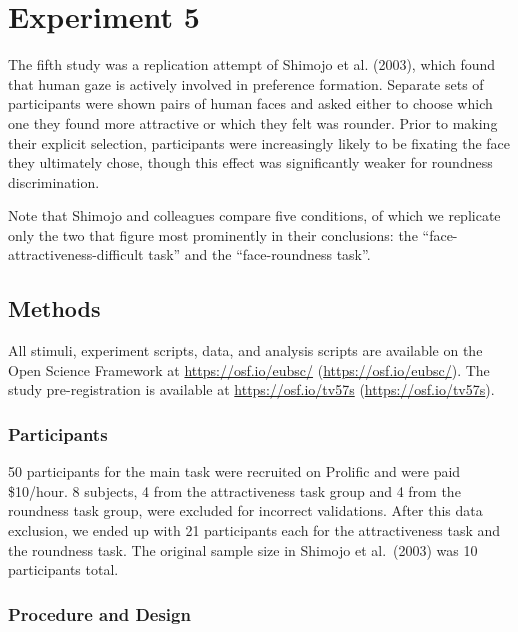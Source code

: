 \documentclass[
  man,floatsintext]{apa6}
\begin{document}
\hypertarget{experiment-5}{%
\section{Experiment 5}\label{experiment-5}}

The fifth study was a replication attempt of Shimojo et al. (2003),
which found that human gaze is actively involved in preference
formation. Separate sets of participants were shown pairs of human faces
and asked either to choose which one they found more attractive or which
they felt was rounder. Prior to making their explicit selection,
participants were increasingly likely to be fixating the face they
ultimately chose, though this effect was significantly weaker for
roundness discrimination.

Note that Shimojo and colleagues compare five conditions, of which we
replicate only the two that figure most prominently in their
conclusions: the ``face-attractiveness-difficult task'' and the
``face-roundness task''.

\hypertarget{methods-4}{%
\subsection{Methods}\label{methods-4}}

All stimuli, experiment scripts, data, and analysis scripts are
available on the Open Science Framework at \url{https://osf.io/eubsc/}
(\url{https://osf.io/eubsc/}). The study pre-registration is available at
\url{https://osf.io/tv57s} (\url{https://osf.io/tv57s}).

\hypertarget{participants-5}{%
\subsubsection{Participants}\label{participants-5}}

50 participants for the main task were recruited on Prolific and were
paid \$10/hour. 8 subjects, 4 from the attractiveness task group and 4 from
the roundness task group, were excluded for incorrect validations.
After this
data exclusion, we ended up with 21 participants each for the
attractiveness task and the roundness task. The original sample size in
Shimojo et al.~(2003) was 10 participants total.

\hypertarget{procedure-and-design}{%
\subsubsection{Procedure and Design}\label{procedure-and-design}}
\end{document}
